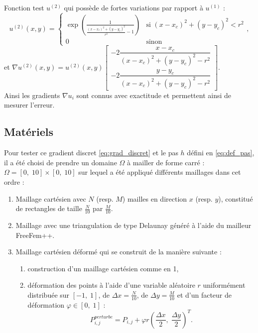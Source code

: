 \documentclass[12pt,a4paper]{article}
\begin{document}
\noindent Fonction test $u^{(2)}$ qui possède de fortes variations par rapport à $u^{(1)}$ :
\[
	u^{(2)}(x,y) = \begin{cases}
		\exp\left(\frac1{\frac{(x-x_c)^2 + (y-y_c)^2}{r^2} - 1}\right) & \text{si } (x-x_c)^2+(y-y_c)^2 < r^2\\
		0 & \text{sinon}
	\end{cases},
\]
et $\nabla u^{(2)}(x,y) = u^{(2)}(x,y)\begin{bmatrix}
	-2\dfrac{x-x_c}{(x-x_c)^2+(y-y_c)^2-r^2}\\
	-2\dfrac{y-y_c}{(x-x_c)^2+(y-y_c)^2-r^2}
\end{bmatrix}.$\\
 Ainsi les gradients $\nabla u_i$ sont connus avec exactitude et permettent ainsi de mesurer l'erreur.
 
 \vspace{-.5cm}

\subsection{Matériels}

 \vspace{-.5cm}

Pour tester ce gradient discret \eqref{eq:grad_discret} et le pas $h$ défini en \eqref{eq:def_pas}, il a été choisi de prendre un domaine $\Omega$ à mailler de forme carré : $ \Omega = [0,\;10]\times[0,\;10]$ sur lequel a été appliqué différents maillages dans cet ordre :
\begin{enumerate}
	\item Maillage cartésien avec $N$  (resp. $M$) mailles en direction $x$ (resp. $y$), constitué de rectangles de taille $\frac N{10}$ par $\frac M{10}$.
	\item Maillage avec une triangulation de type Delaunay généré à l'aide du mailleur FreeFem++.
	\item Maillage cartésien déformé qui se construit de la manière suivante :
	\begin{enumerate}
		\item construction d'un maillage cartésien comme en 1,
		\item déformation des points à l'aide d'une variable aléatoire $r$ uniformément distribuée sur $[-1,\;1]$, de $\Delta x = \frac N{10}$, de $\Delta y = \frac M{10}$ et d'un facteur de déformation $\varphi \in [0,\; 1]$ : 
		\[
			P^{perturbe}_{i,j} = P_{i,j} + \varphi r \left(\frac{\Delta x}2,\; \frac{\Delta y}2 \right)^T.
		\]
	\end{enumerate}
\end{enumerate}
\end{document}
